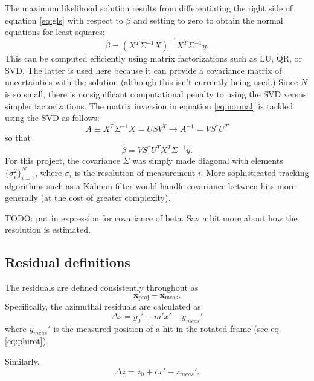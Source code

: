 \documentclass[12pt]{article}
\begin{document}
The maximum likelihood solution results from differentiating the right side of equation \ref{eq:gls} with respect to $\beta$ and setting to zero to obtain the normal equations for least squares:
 \begin{equation}\label{eq:normal}
 \hat\beta = (X^T \Sigma^{-1} X)^{-1} X^T \Sigma^{-1} y.
 \end{equation}
This can be computed efficiently using matrix factorizations such as LU, QR, or SVD. The latter is used here because it can provide a covariance matrix of uncertainties with the solution (although this isn't currently being used.) Since $N$ is so small, there is no significant computational penalty to using the SVD versus simpler factorizations. The matrix inversion in equation \ref{eq:normal} is tackled using the SVD as follows:
\begin{equation}\label{eq:svd}
A \equiv X^T \Sigma^{-1} X = U S V^T \to A^{-1} = V S^{\dagger} U^{T}
\end{equation}
so that 
\begin{equation}\label{eq:betahat}
\hat\beta = V S^{\dagger} U^{T} X^T \Sigma^{-1} y.
\end{equation}
For this project, the covariance $\Sigma$ was simply made diagonal with elements $\{\sigma_i^2 \}_{i=1}^N$, where $\sigma_i$ is the resolution of measurement $i$. More sophisticated tracking algorithms such as a Kalman filter would handle covariance between hits more generally (at the cost of greater complexity).

TODO: put in expression for covariance of beta. Say a bit more about how the resolution is estimated.

\subsection{Residual definitions}
The residuals are defined consistently throughout as 
\begin{equation}\label{eq:resdef}
\mathbf{x}_{\mathrm{proj}} - \mathbf{x}_{\mathrm{meas}}.
\end{equation}
Specifically, the azimuthal residuals are calculated as
\begin{equation} \label{eq:ds}
\Delta s = y_0' + m' x' - y_{meas}'
\end{equation}
where $y_{meas}'$ is the measured position of a hit in the rotated frame (see eq. \ref{eq:phirot}). 

Similarly,
\begin{equation} \label{eq:dz}
\Delta z = z_0 + cx' - z_{meas}'.
\end{equation}
\end{document}
